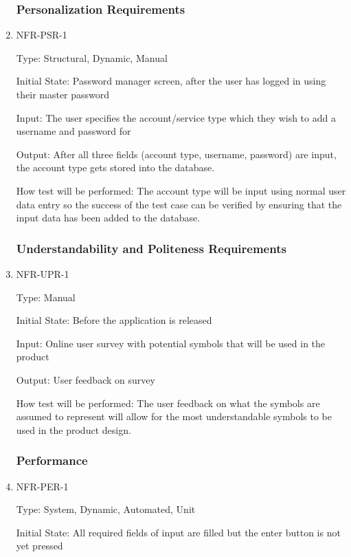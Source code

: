 \documentclass[12pt, titlepage]{article}
\begin{document}
\begin{enumerate}
\subsubsection{Personalization Requirements}

\item{NFR-PSR-1\\}

Type: Structural, Dynamic, Manual

Initial State: Password manager screen, after the user has logged in using their master password

Input: The user specifies the account/service type which they wish to add a username and password for

Output: After all three fields (account type, username, password) are input, the account type gets stored into the database.

How test will be performed: The account type will be input using normal user data entry so the success of the test case can be verified by ensuring that the input data has been added to the database.

\subsubsection{Understandability and Politeness Requirements}

\item{NFR-UPR-1\\}

Type: Manual

Initial State: Before the application is released

Input: Online user survey with potential symbols that will be used in the product

Output: User feedback on survey

How test will be performed: The user feedback on what the symbols are assumed to represent will allow for the most understandable symbols to be used in the product design.

\subsubsection{Performance}

\item{NFR-PER-1\\}

Type: System, Dynamic, Automated, Unit

Initial State: All required fields of input are filled but the enter button is not yet pressed


\end{enumerate}
\end{document}
